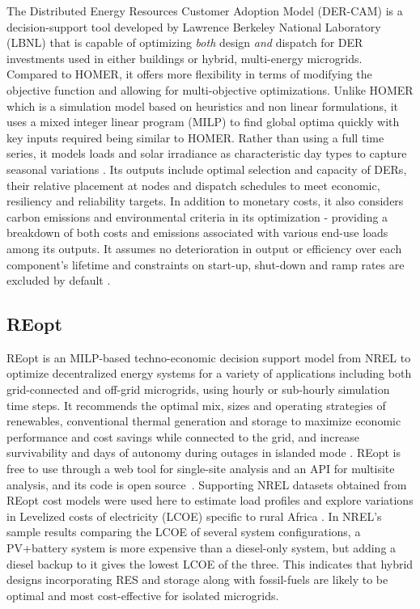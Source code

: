 \documentclass[final,3p,times]{elsarticle}
\begin{document}
The Distributed Energy Resources Customer Adoption Model (DER-CAM) is a decision-support tool developed by Lawrence Berkeley National Laboratory (LBNL) that is capable of optimizing \textit{both} design \textit{and} dispatch for DER investments used in either buildings or hybrid, multi-energy microgrids. Compared to HOMER, it offers more flexibility in terms of modifying the objective function and allowing for multi-objective optimizations. Unlike HOMER which is a simulation model based on heuristics and non linear formulations, it uses a mixed integer linear program (MILP) to find global optima quickly \cite{dercam} with key inputs required being similar to HOMER. Rather than using a full time series, it models loads and solar irradiance as characteristic day types to capture seasonal variations \cite{weng2016}. Its outputs include optimal selection and capacity of DERs, their relative placement at nodes and dispatch schedules to meet economic, resiliency and reliability targets. In addition to monetary costs, it also considers carbon emissions and environmental criteria in its optimization - providing a breakdown of both costs and emissions associated with various end-use loads among its outputs. It assumes no deterioration in output or efficiency over each component's lifetime and constraints on start-up, shut-down and ramp rates are excluded by default \cite{dercam}.

\subsection{REopt}

REopt is an MILP-based techno-economic decision support model from NREL to optimize decentralized energy systems for a variety of applications including both grid-connected and off-grid microgrids, using hourly or sub-hourly simulation time steps. It recommends the optimal mix, sizes and operating strategies of renewables, conventional thermal generation and storage to maximize economic performance and cost savings while connected to the grid, and increase survivability and days of autonomy during outages in islanded mode \cite{tools_summary}. REopt is free to use through a web tool for single-site analysis and an API for multisite analysis, and its code is open source~\cite{reopt_news}. Supporting NREL datasets obtained from REopt cost models were used here to estimate load profiles and explore variations in Levelized costs of electricity (LCOE) specific to rural Africa \cite{nrel_data}. In NREL's sample results comparing the LCOE of several system configurations, a PV+battery system is more expensive than a diesel-only system, but adding a diesel backup to it gives the lowest LCOE of the three. This indicates that hybrid designs incorporating RES and storage along with fossil-fuels are likely to be optimal and most cost-effective for isolated microgrids.
\end{document}
